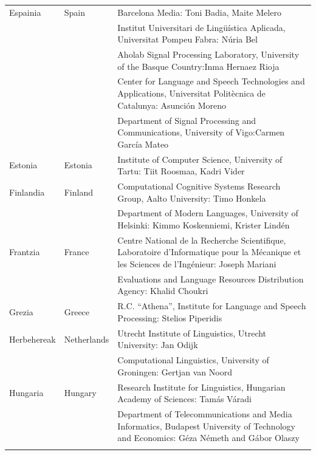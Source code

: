 \begin{longtable}{@{}llp{113mm}@{}}
  Espainia & \textcolor{grey1}{Spain} & Barcelona Media: Toni Badia, Maite Melero \\ \addlinespace 
  & & Institut Universitari de Lingüística Aplicada, Universitat Pompeu Fabra: Núria Bel \\ \addlinespace 
  & & Aholab Signal Processing Laboratory, University of the Basque Country:\newline Inma Hernaez Rioja \\ \addlinespace 
  & & Center for Language and Speech Technologies and Applications, Universitat Politècnica de Catalunya:  Asunción Moreno \\ \addlinespace 
  & & Department of Signal Processing and Communications, University of Vigo:\newline Carmen García Mateo \\ \addlinespace 
  Estonia & \textcolor{grey1}{Estonia} & Institute of Computer Science, University of Tartu: Tiit Roosmaa, Kadri Vider\\ \addlinespace
  Finlandia & \textcolor{grey1}{Finland} & Computational Cognitive Systems Research Group, Aalto University: Timo Honkela\\ \addlinespace
  & & Department of Modern Languages, University of Helsinki: Kimmo Koskenniemi, Krister Lindén \\ \addlinespace
  Frantzia & \textcolor{grey1}{France} & Centre National de la Recherche Scientifique, Laboratoire d'Informatique pour la Mécanique et les Sciences de l'Ingénieur: Joseph Mariani \\ \addlinespace
  & & Evaluations and Language Resources Distribution Agency: Khalid Choukri\\ \addlinespace 
  Grezia & \textcolor{grey1}{Greece} & R.C. “Athena”, Institute for Language and Speech Processing: Stelios Piperidis\\ \addlinespace
  Herbehereak & \textcolor{grey1}{Netherlands} & Utrecht Institute of Linguistics, Utrecht University: Jan Odijk\\ \addlinespace 
  & & Computational Linguistics, University of Groningen: Gertjan van Noord\\ \addlinespace
  Hungaria & \textcolor{grey1}{Hungary} & Research Institute for Linguistics, Hungarian Academy of Sciences: Tamás Váradi\\  \addlinespace
  & & Department of Telecommunications and Media Informatics, Budapest University of Technology and Economics: Géza Németh and Gábor Olaszy\\ \addlinespace

\end{longtable}
